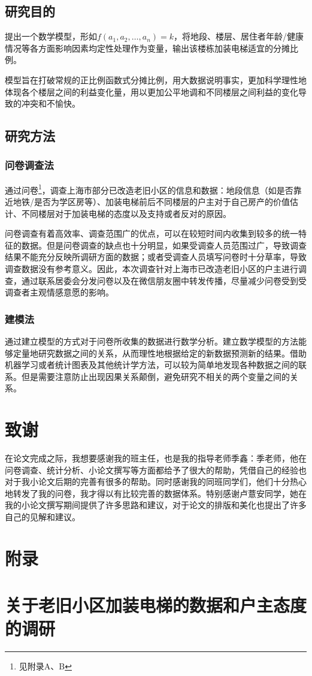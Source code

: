 \documentclass[lang=cn,a4paper]{elegantpaper}
\begin{document}
    \subsection{研究目的}
    提出一个数学模型，形如$f(a_1,a_2,\dots,a_n)=k$，将地段、楼层、居住者年龄/健康情况等各方面影响因素均定性处理作为变量，输出该楼栋加装电梯适宜的分摊比例。

    模型旨在打破常规的正比例函数式分摊比例，用大数据说明事实，更加科学理性地体现各个楼层之间的利益变化量，用以更加公平地调和不同楼层之间利益的变化导致的冲突和不愉快。
    \subsection{研究方法}

    \subsubsection{问卷调查法}
    通过问卷\footnote{见附录A、B}，调查上海市部分已改造老旧小区的信息和数据：地段信息（如是否靠近地铁/是否为学区房等）、加装电梯前后不同楼层的户主对于自己房产的价值估计、不同楼层对于加装电梯的态度以及支持或者反对的原因。

    问卷调查有着高效率、调查范围广的优点，可以在较短时间内收集到较多的统一特征的数据。但是问卷调查的缺点也十分明显，如果受调查人员范围过广，导致调查结果不能充分反映所调研方面的数据；或者受调查人员填写问卷时十分草率，导致调查数据没有参考意义。因此，本次调查针对上海市已改造老旧小区的户主进行调查，通过联系居委会分发问卷以及在微信朋友圈中转发传播，尽量减少问卷受到受调查者主观情感意愿的影响。

    \subsubsection{建模法}
    通过建立模型的方式对于问卷所收集的数据进行数学分析。建立数学模型的方法能够定量地研究数据之间的关系，从而理性地根据给定的新数据预测新的结果。借助机器学习或者统计图表及其他统计学方法，可以较为简单地发现各种数据之间的联系。但是需要注意防止出现因果关系颠倒，避免研究不相关的两个变量之间的关系。

    \section*{致谢}
    在论文完成之际，我想要感谢我的班主任，也是我的指导老师季鑫：季老师，他在问卷调查、统计分析、小论文撰写等方面都给予了很大的帮助，凭借自己的经验也对于我小论文后期的完善有很多的帮助。同时感谢我的同班同学们，他们十分热心地转发了我的问卷，我才得以有比较完善的数据体系。特别感谢卢薏安同学，她在我的小论文撰写期间提供了许多思路和建议，对于论文的排版和美化也提出了许多自己的见解和建议。
    
    \clearpage

    
    
    \clearpage
    
    \section*{附录}
    \appendix

    \section{关于老旧小区加装电梯的数据和户主态度的调研}
\end{document}
